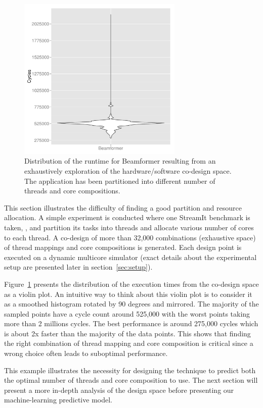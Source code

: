 \begin{figure}[h]
    \centering
    \includegraphics[width=0.7\textwidth]{streamit-paper/graphics/beamformer_motivation.pdf}
    \caption{Distribution of the runtime for Beamformer resulting from an exhaustively exploration of the hardware/software co-design space.
     The application has been partitioned into different number of threads and core compositions.}
     \label{fig:beamformermotiv}
\end{figure}

This section illustrates the difficulty of finding a good partition and resource allocation.
A simple experiment is conducted where one StreamIt benchmark is taken, , and partition its tasks into threads and allocate various number of cores to each thread.
A co-design of more than 32,000 combinations (exhaustive space) of thread mappings and core compositions is generated.
Each design point is executed on a dynamic multicore simulator (exact details about the experimental setup are presented later in section~\ref{sec:setup}).

Figure~\ref{fig:beamformermotiv} presents the distribution of the execution times from the co-design space as a violin plot.
An intuitive way to think about this violin plot is to consider it as a smoothed histogram rotated by 90 degrees and mirrored.
The majority of the sampled points have a cycle count around 525,000 with the worst points taking more than 2 millions cycles.
The best performance is around 275,000 cycles which is about 2x faster than the majority of the data points.
This shows that finding the right combination of thread mapping and core composition is critical since a wrong choice often leads to suboptimal performance.

This example illustrates the necessity for designing the technique to predict both the optimal number of threads and core composition to use.
The next section will present a more in-depth analysis of the design space before presenting our machine-learning predictive model.

